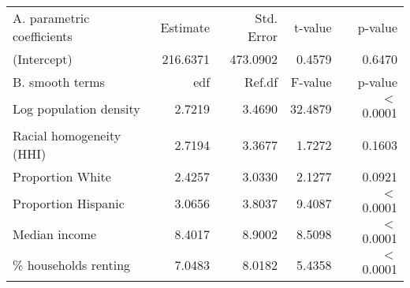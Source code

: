 \begin{table}[ht]
\centering
\begin{tabular}{lrrrr}
   \hline
A. parametric coefficients & Estimate & Std. Error & t-value & p-value \\ 
  (Intercept) & 216.6371 & 473.0902 & 0.4579 & 0.6470 \\ 
   \hline
B. smooth terms & edf & Ref.df & F-value & p-value \\ 
  Log population density & 2.7219 & 3.4690 & 32.4879 & $<$ 0.0001 \\ 
  Racial homogeneity (HHI) & 2.7194 & 3.3677 & 1.7272 & 0.1603 \\ 
  Proportion White & 2.4257 & 3.0330 & 2.1277 & 0.0921 \\ 
  Proportion Hispanic & 3.0656 & 3.8037 & 9.4087 & $<$ 0.0001 \\ 
  Median income & 8.4017 & 8.9002 & 8.5098 & $<$ 0.0001 \\ 
  \% households renting & 7.0483 & 8.0182 & 5.4358 & $<$ 0.0001 \\ 
   \hline
\end{tabular}
\caption{ } 
\label{Demographic GAM}
\end{table}
